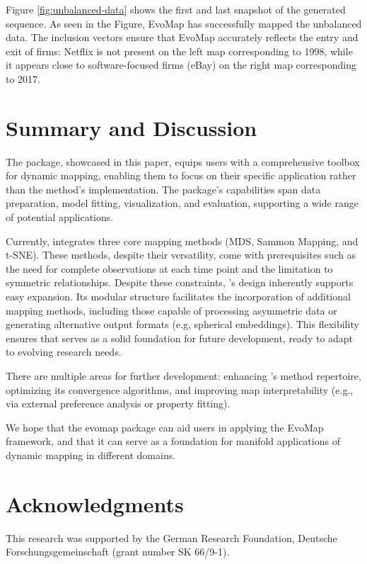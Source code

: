 \documentclass[article]{jss}
\begin{document}
Figure \ref{fig:unbalanced-data} shows the first and last snapshot of the generated sequence. As seen in the Figure,
EvoMap has successfully mapped the unbalanced data. The inclusion vectors ensure that EvoMap accurately reflects the 
entry and exit of firms: Netflix is not present on the left map corresponding to 1998, while it appears close to 
software-focused firms (eBay) on the right map corresponding to 2017.


\section{Summary and Discussion} \label{sec:summary}

The  package, showcased in this paper, equips users with a comprehensive toolbox for dynamic mapping, 
enabling them to focus on their specific application rather than the method's implementation. The package's 
capabilities span data preparation, model fitting, visualization, and evaluation, supporting a wide range of potential
applications.

Currently,  integrates three core mapping methods (MDS, Sammon Mapping, and t-SNE). These methods, 
despite their versatility, come with prerequisites such as the need for complete observations at each time point and the 
limitation to symmetric relationships. Despite these constraints, 's design inherently supports easy 
expansion. Its modular structure facilitates the incorporation of additional mapping methods, including those 
capable of processing asymmetric data or generating alternative output formats (e.g, spherical embeddings). This 
flexibility ensures that  serves as a solid foundation for future development, ready to adapt to 
evolving research needs.

There are multiple areas for further development: enhancing 's method repertoire, optimizing its 
convergence algorithms, and improving map interpretability (e.g., via external preference analysis or property fitting).

We hope that the evomap package can aid users in applying the EvoMap framework, and that it can 
serve as a foundation for manifold applications of dynamic mapping in different domains.

\section*{Acknowledgments}

This research was supported by the German Research Foundation, Deutsche Forschungsgemeinschaft (grant number SK 66/9-1). 



\end{document}
